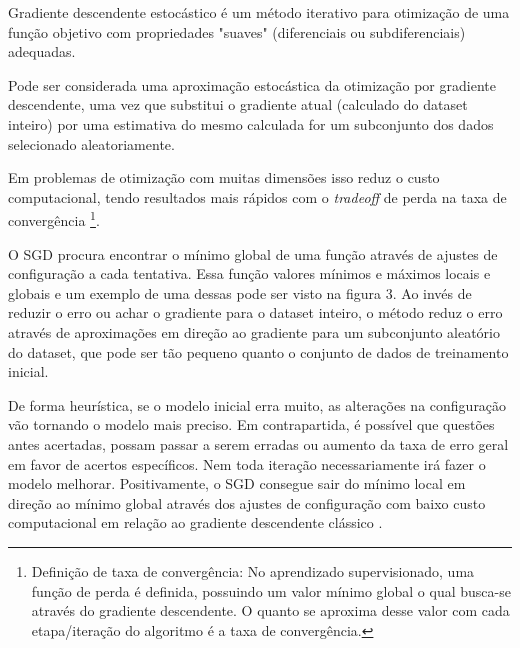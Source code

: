 Gradiente descendente estocástico é um método iterativo para otimização de uma função objetivo com propriedades "suaves" (diferenciais ou subdiferenciais) adequadas. \cite{ruder2016overview}

Pode ser considerada uma aproximação estocástica da otimização por gradiente descendente, uma vez que substitui o gradiente atual (calculado do dataset inteiro) por uma estimativa do mesmo calculada for um subconjunto dos dados selecionado aleatoriamente.

Em problemas de otimização com muitas dimensões isso reduz o custo computacional, tendo resultados mais rápidos com o \textit{tradeoff} de perda na taxa de convergência \footnote{Definição de taxa de convergência: No aprendizado supervisionado, uma função de perda é definida, possuindo um valor mínimo global o qual busca-se através do gradiente descendente. O quanto se aproxima desse valor com cada etapa/iteração do algoritmo é a taxa de convergência.}.

O SGD procura encontrar o mínimo global de uma função através de ajustes de configuração a cada tentativa. Essa função valores mínimos e máximos locais e globais e um exemplo de uma dessas pode ser visto na figura 3. Ao invés de reduzir o erro ou achar o gradiente para o dataset inteiro, o método reduz o erro através de aproximações em direção ao gradiente para um subconjunto aleatório do dataset, que pode ser tão pequeno quanto o conjunto de dados de treinamento inicial.

De forma heurística, se o modelo inicial erra muito, as alterações na configuração vão tornando o modelo mais preciso. Em contrapartida, é possível que questões antes acertadas, possam passar a serem erradas ou aumento da taxa de erro geral em favor de acertos específicos. Nem toda iteração necessariamente irá fazer o modelo melhorar.
Positivamente, o SGD consegue sair do mínimo local em direção ao mínimo global através dos ajustes de configuração com baixo custo computacional em relação ao gradiente descendente clássico \cite{overview_gradient_descent_stochastic}.

